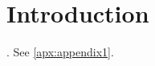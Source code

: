 \chapter{Introduction}
\label{cha:introduction}

\lipsum[1-2] \cite{Schneider1993}. See \ref{apx:appendix1}.

